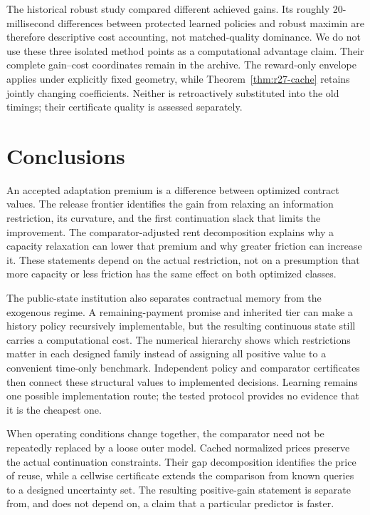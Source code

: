 \documentclass[11pt,letterpaper]{article}
\theoremstyle{definition}\newtheorem{assumption}[theorem]{Assumption}
\begin{document}
The historical robust study compared different achieved gains. Its roughly 20-millisecond differences between protected learned policies and robust maximin are therefore descriptive cost accounting, not matched-quality dominance. We do not use these three isolated method points as a computational advantage claim. Their complete gain--cost coordinates remain in the archive. The reward-only envelope applies under explicitly fixed geometry, while Theorem~\ref{thm:r27-cache} retains jointly changing coefficients. Neither is retroactively substituted into the old timings; their certificate quality is assessed separately.

\section{Conclusions}
An accepted adaptation premium is a difference between optimized contract values. The release frontier identifies the gain from relaxing an information restriction, its curvature, and the first continuation slack that limits the improvement. The comparator-adjusted rent decomposition explains why a capacity relaxation can lower that premium and why greater friction can increase it. These statements depend on the actual restriction, not on a presumption that more capacity or less friction has the same effect on both optimized classes.

The public-state institution also separates contractual memory from the exogenous regime. A remaining-payment promise and inherited tier can make a history policy recursively implementable, but the resulting continuous state still carries a computational cost. The numerical hierarchy shows which restrictions matter in each designed family instead of assigning all positive value to a convenient time-only benchmark. Independent policy and comparator certificates then connect these structural values to implemented decisions. Learning remains one possible implementation route; the tested protocol provides no evidence that it is the cheapest one.

When operating conditions change together, the comparator need not be repeatedly replaced by a loose outer model. Cached normalized prices preserve the actual continuation constraints. Their gap decomposition identifies the price of reuse, while a cellwise certificate extends the comparison from known queries to a designed uncertainty set. The resulting positive-gain statement is separate from, and does not depend on, a claim that a particular predictor is faster.
\end{document}
